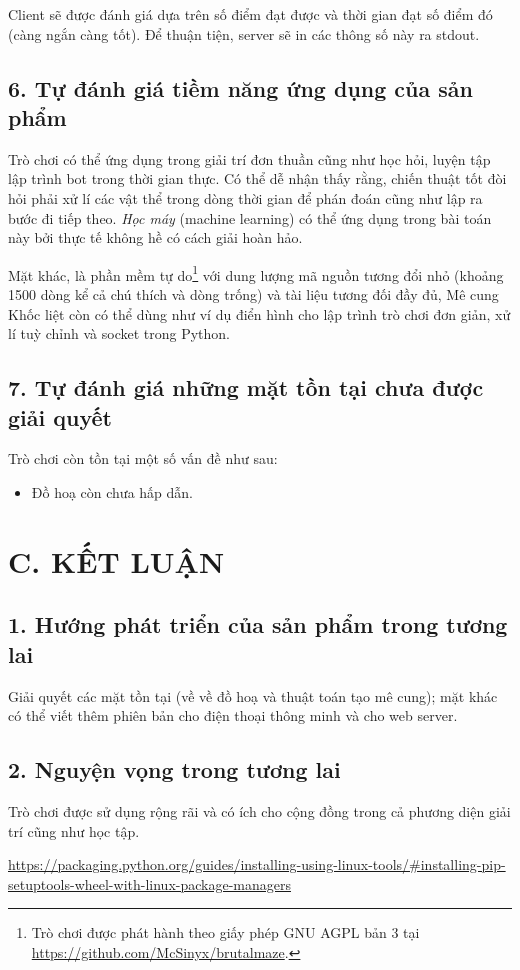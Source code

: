 \documentclass[a4paper,12pt]{article}
\begin{document}
Client sẽ được đánh giá dựa trên số điểm đạt được và thời gian đạt số điểm đó
(càng ngắn càng tốt). Để thuận tiện, server sẽ in các thông số này ra stdout.

\subsection*{6. Tự đánh giá tiềm năng ứng dụng của sản phẩm}
Trò chơi có thể ứng dụng trong giải trí đơn thuần cũng như học hỏi, luyện tập
lập trình bot trong thời gian thực. Có thể dễ nhận thấy rằng, chiến thuật tốt
đòi hỏi phải xử lí các vật thể trong dòng thời gian để phán đoán cũng như lập ra
bước đi tiếp theo. \emph{Học máy} (machine learning) có thể ứng dụng trong bài
toán này bởi thực tế không hề có cách giải hoàn hảo.

Mặt khác, là phần mềm tự do\footnote{Trò chơi được phát hành theo giấy phép GNU
AGPL bản 3 tại \url{https://github.com/McSinyx/brutalmaze}.} với dung
lượng mã nguồn tương đổi nhỏ (khoảng 1500 dòng kể cả chú thích và dòng trống) và
tài liệu tương đối đầy đủ, Mê cung Khốc liệt còn có thể dùng như ví dụ điển hình
cho lập trình trò chơi đơn giản, xử lí tuỳ chỉnh và socket trong Python.

\subsection*{7. Tự đánh giá những mặt tồn tại chưa được giải quyết}
Trò chơi còn tồn tại một số vấn đề như sau:
\begin{itemize}
  \item Đồ hoạ còn chưa hấp dẫn.
\end{itemize}

\section*{C. KẾT LUẬN}
\subsection*{1. Hướng phát triển của sản phẩm trong tương lai}
Giải quyết các mặt tồn tại (về về đồ hoạ và thuật toán tạo mê cung); mặt khác có
thể viết thêm phiên bản cho điện thoại thông minh và cho web server.
\subsection*{2. Nguyện vọng trong tương lai}
Trò chơi được sử dụng rộng rãi và có ích cho cộng đồng trong cả phương diện giải
trí cũng như học tập.

\renewcommand{\refname}{D. TÀI LIỆU THAM KHẢO}
\begin{thebibliography}{99}
   \url{https://packaging.python.org/guides/installing-using-linux-tools/\#installing-pip-setuptools-wheel-with-linux-package-managers}
\end{thebibliography}


\end{document}
